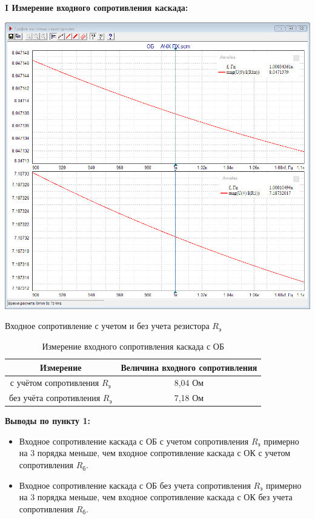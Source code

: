 \documentclass[a4paper,14pt]{extarticle}
\begin{document}
    \newpage
    \textbf{I Измерение входного сопротивления каскада:}
    \begin{center}
        \includegraphics[scale=0.3]{1.png}
    \end{center}
    \begin{center}
        Входное сопротивление с учетом и без учета резистора $R_{\text{э}}$ 
    \end{center}
    \begin{table}[ht]
        \begin{center}
            \caption{Измерение входного сопротивления каскада с ОБ}
            \begin{tabular}{ |c|c| }
                \hline
                Измерение & Величина входного сопротивления\\
                \hline
                с учётом сопротивления $R_{\text{э}}$ & 8,04 Ом\\
                \hline
                без учёта сопротивления $R_{\text{э}}$ & 7,18 Ом\\
                \hline
            \end{tabular}
        \end{center}
    \end{table}
    \textbf{Выводы по пункту 1:}
    \vspace{-6ex}
    \begin{singlespace}
        \begin{itemize}
            \item Входное сопротивление каскада с ОБ с учетом сопротивления $R_{\text{э}}$ примерно на 3 порядка меньше,
             чем входное сопротивление каскада с ОК с учетом сопротивления $R_{\text{б}}$.
            \item Входное сопротивление каскада с ОБ без учета сопротивления $R_{\text{э}}$ примерно на 3 порядка меньше,
             чем входное сопротивление каскада с ОК без учета сопротивления $R_{\text{б}}$.
        \end{itemize}
    \end{singlespace}
\end{document}
